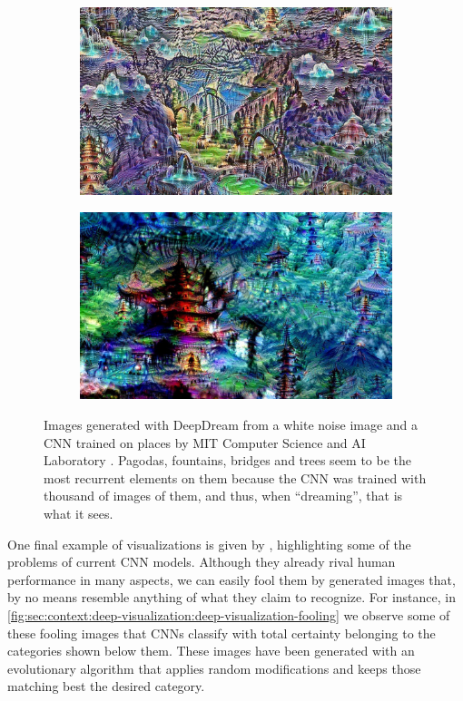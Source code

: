 \begin{figure}[htbp]
  \begin{subfigure}[b]{\textwidth}
    \includegraphics[width=\textwidth]{gfx/dream-buildings-1}
  \end{subfigure}
  \begin{subfigure}[b]{\textwidth}
    \includegraphics[width=\textwidth]{gfx/dream-buildings-2}
  \end{subfigure}
  \caption{
    Images generated with DeepDream from a white noise image and a CNN trained on places by MIT Computer Science and AI Laboratory \cite{Mordvintsev2015}.
    Pagodas, fountains, bridges and trees seem to be the most recurrent elements on them because the CNN was trained with thousand of images of them, and thus, when ``dreaming'', that is what it sees.
  }
  \label{fig:sec:context:deep-visualization:dream-buildings}
\end{figure}

One final example of visualizations is given by \citet{Nguyen2014}, highlighting some of the problems of current CNN models.
Although they already rival human performance in many aspects, we can easily fool them by generated images that, by no means resemble anything of what they claim to recognize.
For instance, in \autoref{fig:sec:context:deep-visualization:deep-visualization-fooling} we observe some of these fooling images that CNNs classify with total certainty belonging to the categories shown below them.
These images have been generated with an evolutionary algorithm that applies random modifications and keeps those matching best the desired category.

